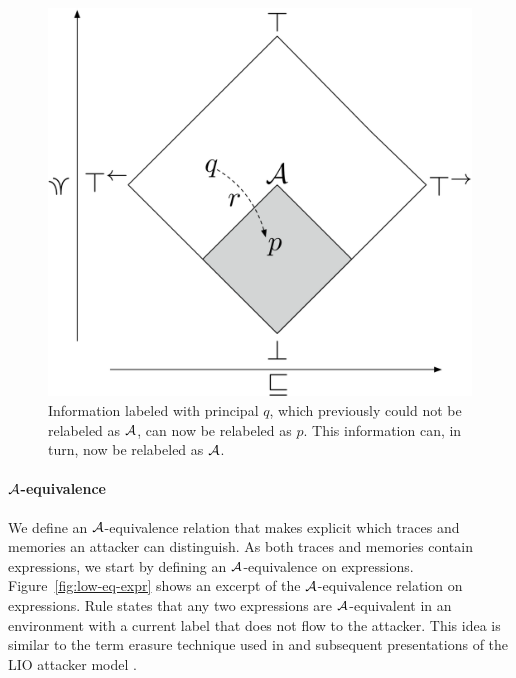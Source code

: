 \begin{figure}
    \centering
    \includegraphics[scale=0.25]{Illustrations/bad-flow.pdf}
    \caption{Information labeled with principal $q$, which previously could not be relabeled as $\mathcal{A}$, can now be relabeled as $p$. This information can, in turn, now be relabeled as $\mathcal{A}$.}
    \label{fig:bad-release}
\end{figure}

\paragraph{$\mathcal{A}$-equivalence}
We define an $\mathcal{A}$-equivalence relation that makes explicit which traces and memories an attacker can distinguish. As both traces and memories contain expressions, we start by defining an $\mathcal{A}$-equivalence on expressions. Figure~\ref{fig:low-eq-expr} shows an excerpt of the $\mathcal{A}$-equivalence relation on expressions. Rule  states that any two expressions are $\mathcal{A}$-equivalent in an environment with a current label that does not flow to the attacker. This idea is similar to the term erasure technique used in \cite{SRMMlio} and subsequent presentations of the LIO attacker model \cite{Stefan:2012:ACT:2364527.2364557, 10.1007/978-3-642-40203-6_40, 10.1007/978-3-319-24858-5_13}.


